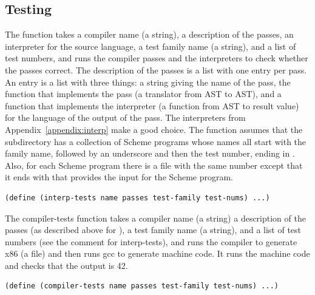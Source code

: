 \documentclass[11pt]{book}
\begin{document}


\subsection{Testing}

The  function takes a compiler name (a string), a
description of the passes, an interpreter for the source language, a
test family name (a string), and a list of test numbers, and runs the
compiler passes and the interpreters to check whether the passes
correct. The description of the passes is a list with one entry per
pass.  An entry is a list with three things: a string giving the name
of the pass, the function that implements the pass (a translator from
AST to AST), and a function that implements the interpreter (a
function from AST to result value) for the language of the output of
the pass.  The interpreters from Appendix~\ref{appendix:interp} make a
good choice.  The  function assumes that the
subdirectory  has a collection of Scheme programs whose names
all start with the family name, followed by an underscore and then the
test number, ending in . Also, for each Scheme program there
is a file with the same number except that it ends with  that
provides the input for the Scheme program.
\begin{lstlisting}
(define (interp-tests name passes test-family test-nums) ...)
\end{lstlisting}

The compiler-tests function takes a compiler name (a string) a
description of the passes (as described above for
), a test family name (a string), and a list of
test numbers (see the comment for interp-tests), and runs the compiler
to generate x86 (a  file) and then runs gcc to generate
machine code.  It runs the machine code and checks that the output is
42.
\begin{lstlisting}
(define (compiler-tests name passes test-family test-nums) ...)
\end{lstlisting}
\end{document}
